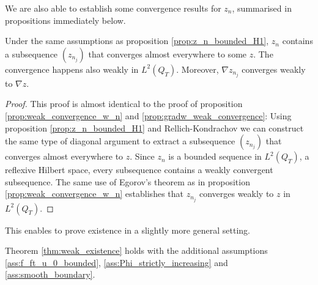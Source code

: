 \documentclass[11pt, a4paper]{article}
\begin{document}
We are also able to establish some convergence results for $z_n$, summarised in propositions immediately below.

\begin{proposition}
\label{prop:z_n_weak_convergence}
Under the same assumptions as proposition \ref{prop:z_n_bounded_H1}, $z_n$ contains a subsequence $(z_{n_j})$ that converges almost everywhere to some $z$. The convergence happens also weakly in $L^2(Q_T)$. Moreover, $\nabla z_{n_j}$ converges weakly to $\nabla z$.
\end{proposition}

\begin{proof}
This proof is almost identical to the proof of proposition \ref{prop:weak_convergence_w_n} and \ref{prop:gradw_weak_convergence}: Using proposition \ref{prop:z_n_bounded_H1} and Rellich-Kondrachov we can construct the same type of diagonal argument to extract a subsequence $(z_{n_j})$ that converges almost everywhere to $z$. Since $z_n$ is a bounded sequence in $L^2(Q_T)$, a reflexive Hilbert space, every subsequence contains a weakly convergent subsequence. The same use of Egorov's theorem as in proposition \ref{prop:weak_convergence_w_n} establishes that $z_{n_j}$ converges weakly to $z$ in $L^2(Q_T)$.
\end{proof}

This enables to prove existence in a slightly more general setting.
\begin{lemma}
\label{lem:weak_existence_part2}
Theorem \ref{thm:weak_existence} holds with the additional assumptions \ref{ass:f_ft_u_0_bounded}, \ref{ass:Phi_strictly_increasing} and \ref{ass:smooth_boundary}.
\end{lemma}
\end{document}
